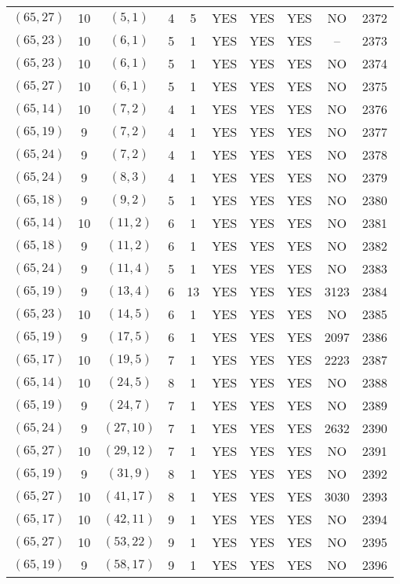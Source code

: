 \begin{longtable}{|c|c|c|c|c|c|c|c|c|c|}
$(65, 27)$ & 10 & $(5, 1)$ & 4 & 5 & YES & YES & YES & NO & 2372\\
$(65, 23)$ & 10 & $(6, 1)$ & 5 & 1 & YES & YES & YES & -- & 2373\\
$(65, 23)$ & 10 & $(6, 1)$ & 5 & 1 & YES & YES & YES & NO & 2374\\
$(65, 27)$ & 10 & $(6, 1)$ & 5 & 1 & YES & YES & YES & NO & 2375\\
$(65, 14)$ & 10 & $(7, 2)$ & 4 & 1 & YES & YES & YES & NO & 2376\\
$(65, 19)$ & 9 & $(7, 2)$ & 4 & 1 & YES & YES & YES & NO & 2377\\
$(65, 24)$ & 9 & $(7, 2)$ & 4 & 1 & YES & YES & YES & NO & 2378\\
$(65, 24)$ & 9 & $(8, 3)$ & 4 & 1 & YES & YES & YES & NO & 2379\\
$(65, 18)$ & 9 & $(9, 2)$ & 5 & 1 & YES & YES & YES & NO & 2380\\
$(65, 14)$ & 10 & $(11, 2)$ & 6 & 1 & YES & YES & YES & NO & 2381\\
$(65, 18)$ & 9 & $(11, 2)$ & 6 & 1 & YES & YES & YES & NO & 2382\\
$(65, 24)$ & 9 & $(11, 4)$ & 5 & 1 & YES & YES & YES & NO & 2383\\
$(65, 19)$ & 9 & $(13, 4)$ & 6 & 13 & YES & YES & YES & 3123 & 2384\\
$(65, 23)$ & 10 & $(14, 5)$ & 6 & 1 & YES & YES & YES & NO & 2385\\
$(65, 19)$ & 9 & $(17, 5)$ & 6 & 1 & YES & YES & YES & 2097 & 2386\\
$(65, 17)$ & 10 & $(19, 5)$ & 7 & 1 & YES & YES & YES & 2223 & 2387\\
$(65, 14)$ & 10 & $(24, 5)$ & 8 & 1 & YES & YES & YES & NO & 2388\\
$(65, 19)$ & 9 & $(24, 7)$ & 7 & 1 & YES & YES & YES & NO & 2389\\
$(65, 24)$ & 9 & $(27, 10)$ & 7 & 1 & YES & YES & YES & 2632 & 2390\\
$(65, 27)$ & 10 & $(29, 12)$ & 7 & 1 & YES & YES & YES & NO & 2391\\
$(65, 19)$ & 9 & $(31, 9)$ & 8 & 1 & YES & YES & YES & NO & 2392\\
$(65, 27)$ & 10 & $(41, 17)$ & 8 & 1 & YES & YES & YES & 3030 & 2393\\
$(65, 17)$ & 10 & $(42, 11)$ & 9 & 1 & YES & YES & YES & NO & 2394\\
$(65, 27)$ & 10 & $(53, 22)$ & 9 & 1 & YES & YES & YES & NO & 2395\\
$(65, 19)$ & 9 & $(58, 17)$ & 9 & 1 & YES & YES & YES & NO & 2396\\

\end{longtable}

